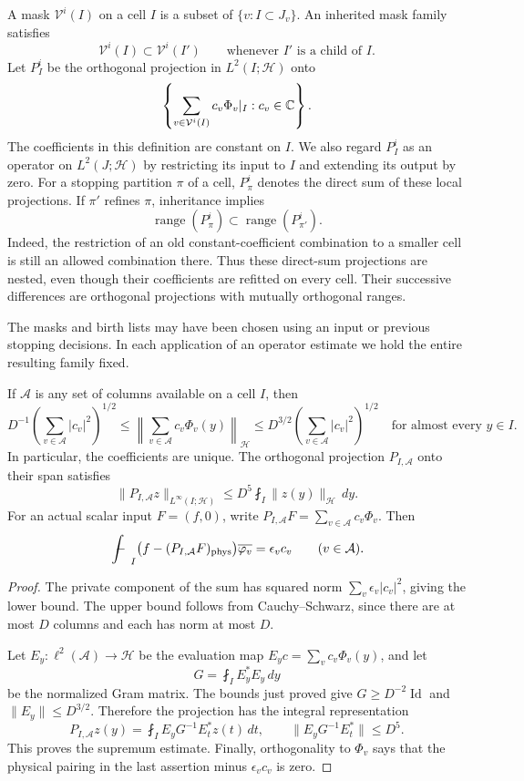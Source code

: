A mask $\mathcal V^i(I)$ on a cell $I$ is a subset of
$\{v:I\subset J_v\}$.  An inherited mask family satisfies
\[
 \mathcal V^i(I)\subset\mathcal V^i(I')
 \qquad\text{whenever }I'\text{ is a child of }I.
\]
Let $P_I^i$ be the orthogonal projection in $L^2(I;\mathcal H)$ onto
\[
 \left\{\sum_{v\in\mathcal V^i(I)}c_v\Phi_v|_I:c_v\in\mathbb C\right\}.
\]
The coefficients in this definition are constant on $I$.  We also regard
$P_I^i$ as an operator on $L^2(J;\mathcal H)$ by restricting its input to $I$
and extending its output by zero.  For a stopping partition $\pi$ of a cell,
$P_\pi^i$ denotes the direct sum of these local projections.  If $\pi'$
refines $\pi$, inheritance implies
\[
 \operatorname{range}(P_\pi^i)
     \subset\operatorname{range}(P_{\pi'}^i).
\]
Indeed, the restriction of an old constant-coefficient combination to a
smaller cell is still an allowed combination there.  Thus these direct-sum
projections are nested, even though their coefficients are refitted on every
cell.  Their successive differences are orthogonal projections with mutually
orthogonal ranges.

The masks and birth lists may have been chosen using an input or previous
stopping decisions.  In each application of an operator estimate we hold the
entire resulting family fixed.

\begin{lemma}
\label{lem:private-columns}
If $\mathcal A$ is any set of columns available on a cell $I$, then
\[
 D^{-1}\left(\sum_{v\in\mathcal A}|c_v|^2\right)^{1/2}
 \le \left\|\sum_{v\in\mathcal A}c_v\Phi_v(y)\right\|_{\mathcal H}
 \le D^{3/2}\left(\sum_{v\in\mathcal A}|c_v|^2\right)^{1/2}
 \quad\text{for almost every }y\in I.
\]
In particular, the coefficients are unique.  The orthogonal projection
$P_{I,\mathcal A}$ onto their span satisfies
\[
 \|P_{I,\mathcal A}z\|_{L^\infty(I;\mathcal H)}
       \le D^5\fint_I\|z(y)\|_{\mathcal H}\,dy.
\]
For an actual scalar input $F=(f,0)$, write
$P_{I,\mathcal A}F=\sum_{v\in\mathcal A}c_v\Phi_v$.  Then
\[
 \fint_I\bigl(f-(P_{I,\mathcal A}F)_{\phys}\bigr)
                         \overline{\varphi_v}
       =\epsilon_v c_v \qquad(v\in\mathcal A).
\]
\end{lemma}

\begin{proof}
The private component of the sum has squared norm
$\sum_v\epsilon_v|c_v|^2$, giving the lower bound.  The upper bound follows
from Cauchy--Schwarz, since there are at most $D$ columns and each has norm at
most $D$.

Let $E_y:\ell^2(\mathcal A)\to\mathcal H$ be the evaluation map
$E_yc=\sum_vc_v\Phi_v(y)$, and let
\[
 G=\fint_I E_y^*E_y\,dy
\]
be the normalized Gram matrix.  The bounds just proved give
$G\ge D^{-2}\operatorname{Id}$ and $\|E_y\|\le D^{3/2}$.  Therefore the
projection has the integral representation
\[
 P_{I,\mathcal A}z(y)
      =\fint_I E_yG^{-1}E_t^*z(t)\,dt,
 \qquad \|E_yG^{-1}E_t^*\|\le D^5.
\]
This proves the supremum estimate.  Finally, orthogonality to $\Phi_v$ says
that the physical pairing in the last assertion minus $\epsilon_vc_v$ is
zero.
\end{proof}

